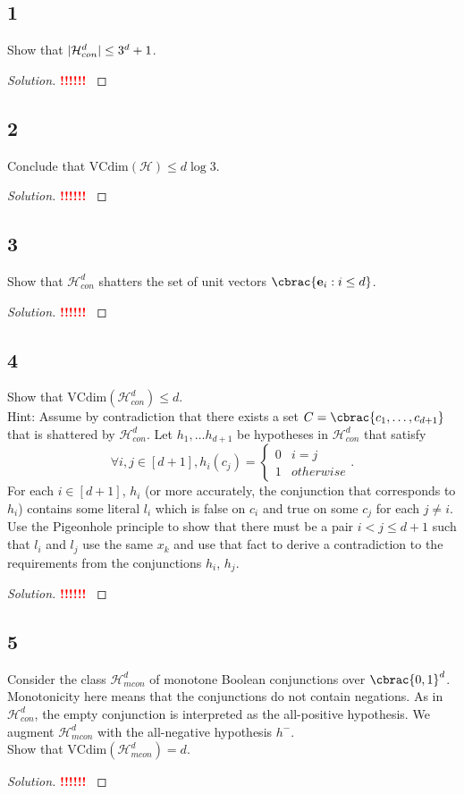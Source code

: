 \documentclass[10pt, a4paper, twoside]{amsart}
\DeclarePairedDelimiter\abs{\lvert}{\rvert}
\DeclarePairedDelimiter\cbrac\{\}
\newcommand{\cH}{\ensuremath{\mathcal{H}}}
\newenvironment{solution}
               {\let\oldqedsymbol=\qedsymbol
                \renewcommand{\qedsymbol}{$\blacktriangleleft$}
                \begin{proof}[Solution]}
               {\end{proof}
                \renewcommand{\qedsymbol}{\oldqedsymbol}}
\newcommand{\TODO}{\textcolor{red}{\textbf{!!!!!! }}}
\begin{document}
\subsection*{1}
Show that $\abs{\cH^d_{con}} \leq 3^d + 1$.
\begin{solution}
\TODO
\end{solution}
\subsection*{2}
Conclude that $\text{VCdim}(\cH) \leq d \log 3$.
\begin{solution}
\TODO
\end{solution}
\subsection*{3}
Show that $\cH^d_{con}$ shatters the set of unit vectors $\cbrac{\mathbf{e}_i:i \leq d}$.
\begin{solution}
\TODO
\end{solution}
\subsection*{4}
Show that $\text{VCdim}(\cH_{con}^d) \leq d$.\\
Hint: Assume by contradiction that there exists a set $C = \cbrac{c_1, \ldots , c_{d+1}}$ that is shattered by $\cH^d_{con}$. Let $h_1, \ldots h_{d+1}$ be hypotheses in $\cH^d_{con}$ that satisfy
\begin{equation*}
  \forall i,j \in [d+1], h_i(c_j) = \begin{cases} 0 & i=j \\
    1 & otherwise\end{cases}.
\end{equation*}
For each $i \in [d+1]$, $h_i$ (or more accurately, the conjunction that corresponds to $h_i$) contains some literal $l_i$ which is false on $c_i$ and true on some $c_j$ for each $j \neq i$. Use the Pigeonhole principle to show that there must be a pair $i < j \leq d+1$ such that $l_i$ and $l_j$ use the same $x_k$ and use that fact to derive a contradiction to the requirements from the conjunctions $h_i$, $h_j$.
\begin{solution}
\TODO
\end{solution}
\subsection*{5}
Consider the class $\cH^d_{mcon}$ of monotone Boolean conjunctions over $\cbrac{0,1}^d$. Monotonicity here means that the conjunctions do not contain negations. As in $\cH^d_{con}$, the empty conjunction is interpreted as the all-positive hypothesis. We augment $\cH^d_{mcon}$ with the all-negative hypothesis $h^-$.\\
Show that $\text{VCdim}(\cH_{mcon}^d) = d$.
\begin{solution}
\TODO
\end{solution}
\end{document}
